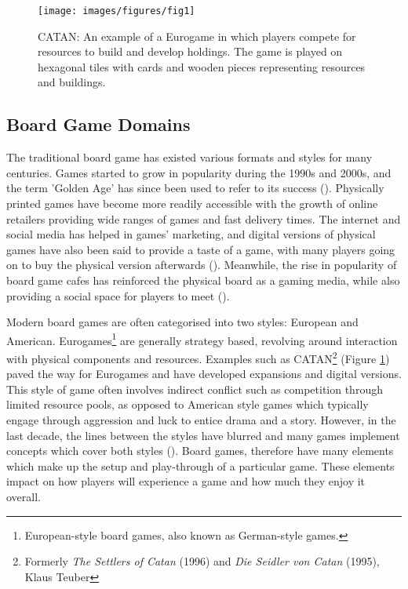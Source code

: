\documentclass[12pt]{article}
\begin{document}
\begin{figure}[h]
    \centering
    \texttt{[image: images/figures/fig1]}
    \caption[CATAN]{CATAN: An example of a  Eurogame in which players compete for resources to build and develop holdings. The game is played on hexagonal tiles with cards and wooden pieces representing resources and buildings.}
    \label{fig:catan}
\end{figure}

\subsection{Board Game Domains}
The traditional board game has existed various formats and styles for many centuries. 
Games started to grow in popularity during the 1990s and 2000s, and the term 'Golden Age' has since been used to refer to its success (\cite{guardian2014,konieczny2019golden}). 
Physically printed games have become more readily accessible with the growth of online retailers providing wide ranges of games and fast delivery times. 
The internet and social media has helped in games' marketing, and digital versions of physical games have also been said to provide a taste of a game, with many players going on to buy the physical version afterwards (\cite{guardian2014}).
Meanwhile, the rise in popularity of board game cafes has reinforced the physical board as a gaming media, while also providing a social space for players to meet (\cite{konieczny2019golden}).

Modern board games are often categorised into two styles: European and American.
Eurogames\footnote{European-style board games, also known as German-style games.} are generally strategy based, revolving around interaction with physical components and resources.
Examples such as CATAN\footnote{Formerly \textit{The Settlers of Catan} (1996) and \textit{Die Seidler von Catan} (1995), Klaus Teuber} (Figure \ref{fig:catan}) paved the way for Eurogames and have developed expansions and digital versions. 
This style of game often involves indirect conflict such as competition through limited resource pools, as opposed to American style games which typically engage through aggression and luck to entice drama and a story.
However, in the last decade, the lines between the styles have blurred and many games implement concepts which cover both styles (\cite{guardian2014}).
Board games, therefore have many elements which make up the setup and play-through of a particular game. These elements impact on how players will experience a game and how much they enjoy it overall.
\end{document}
